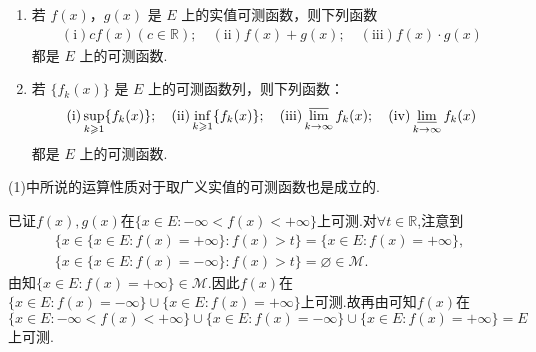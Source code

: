 \documentclass[../../main.tex]{subfiles}
\begin{document}
\begin{theorem}[可测函数的运算性质]\label{theorem:可测函数的运算性质}
\begin{enumerate}[(1)]
\item 若 \(f(x)\)，\(g(x)\) 是 \(E\) 上的实值可测函数，则下列函数
\begin{align*}
(\text{i})cf(x)(c \in \mathbb{R});\quad (\text{ii}) f(x) + g(x); \quad (\text{iii})f(x)\cdot g(x)
\end{align*}
都是 \(E\) 上的可测函数.

\item 若 \(\{f_k(x)\}\) 是 \(E\) 上的可测函数列，则下列函数：
\begin{align*}
(\text{i}) \sup_{k \geqslant 1}\{f_k(x)\};\quad (\text{ii})\inf_{k \geqslant 1}\{f_k(x)\} ;\quad (\text{iii})\varlimsup_{k \to \infty} f_k(x) ;\quad (\text{iv}) \varliminf_{k \to \infty} f_k(x)
\end{align*}
都是 \(E\) 上的可测函数.
\end{enumerate}
\end{theorem}
\begin{remark}
(1)中所说的运算性质对于取广义实值的可测函数也是成立的.

已证$f(x),g(x)$在$\{x\in E:-\infty<f(x)<+\infty\}$上可测.对$\forall t\in \mathbb{R}$,注意到
\begin{gather*}
\{x\in  \{x\in E:f(x)=+\infty\}:f(x)>t\}=\{x\in E:f(x)=+\infty\},
\\
\{x\in \{x\in E:f(x)=-\infty\}:f(x)>t\}=\varnothing\in \mathscr{M}.
\end{gather*}
由知$\{x\in E:f(x)=+\infty\}\in \mathscr{M}$.因此$f(x)$在$\{x\in E:f(x)=-\infty\}\cup\{x\in E:f(x)=+\infty\}$上可测.故再由可知$f(x)$在$\{x\in E:-\infty<f(x)<+\infty\}\cup \{x\in E:f(x)=-\infty\}\cup\{x\in E:f(x)=+\infty\}=E$上可测.

\end{remark}
\end{document}
